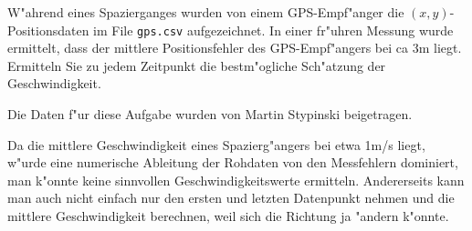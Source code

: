 W"ahrend eines Spazierganges wurden von einem GPS-Empf"anger die
$(x,y)$-Positionsdaten im File \texttt{gps.csv} aufgezeichnet.
In einer fr"uhren Messung wurde ermittelt, dass der mittlere Positionsfehler
des GPS-Empf"angers bei ca 3m liegt.
Ermitteln Sie zu jedem Zeitpunkt die bestm"ogliche Sch"atzung 
der Geschwindigkeit.

Die Daten f"ur diese Aufgabe wurden von Martin Stypinski beigetragen.

\begin{loesung}
Da die mittlere Geschwindigkeit eines Spazierg"angers bei etwa 1m/s liegt,
w"urde eine numerische Ableitung der Rohdaten von den Messfehlern dominiert,
man k"onnte keine sinnvollen Geschwindigkeitswerte ermitteln.
Andererseits kann man auch nicht einfach nur den ersten und letzten
Datenpunkt nehmen und die mittlere Geschwindigkeit berechnen, weil
sich die Richtung ja "andern k"onnte.


\end{loesung}

